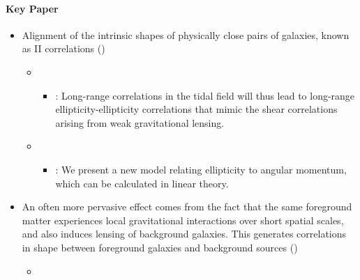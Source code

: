 \documentclass[letterpaper,10pt,english]{sphinxmanual}
\begin{document}
\paragraph{Key Paper}
\label{\detokenize{resource/astro/reference/wl_intrinsic_alignment:key-paper}}\begin{itemize}
\item {} 
Alignment of the intrinsic shapes of physically close pairs of
galaxies, known as II correlations ()
\begin{itemize}
\item {} 
\begin{itemize}
\item {} 
: Long-range correlations in the tidal
field will thus lead to long-range ellipticity-ellipticity
correlations that mimic the shear correlations arising from
weak gravitational lensing.

\end{itemize}

\item {} 
\begin{itemize}
\item {} 
: We present a new model relating
ellipticity to angular momentum, which can be calculated in
linear theory.

\end{itemize}

\end{itemize}

\item {} 
An often more pervasive effect comes from the fact that the same
foreground matter experiences local gravitational interactions over
short spatial scales, and also induces lensing of background
galaxies. This generates correlations in shape between foreground
galaxies and background sources ()
\begin{itemize}
\item {} 

\end{itemize}


\end{itemize}
\end{document}
